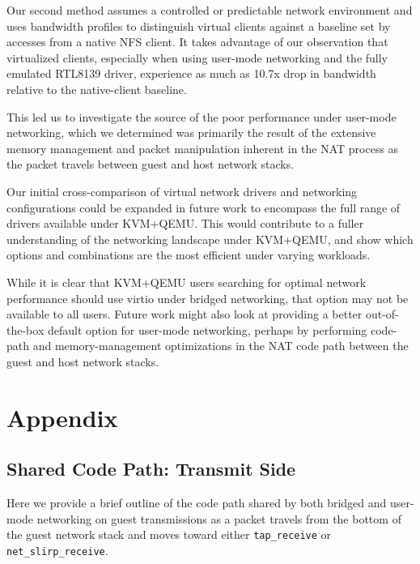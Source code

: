 \documentclass[letterpaper,twocolumn,11pt]{article}
\begin{document}
Our second method assumes a controlled or predictable network environment and uses bandwidth profiles to distinguish virtual clients against a baseline set by accesses from a native NFS client. It takes advantage of our observation that virtualized clients, especially when using user-mode networking and the fully emulated RTL8139 driver, experience as much as 10.7x drop in bandwidth relative to the native-client baseline. 

This led us to investigate the source of the poor performance under user-mode networking, which we determined was primarily the result of the extensive memory management and packet manipulation inherent in the NAT process as the packet travels between guest and host network stacks.

Our initial cross-comparison of virtual network drivers and networking configurations could be expanded in future work to encompass the full range of drivers available under KVM+QEMU. This would contribute to a fuller understanding of the networking landscape under KVM+QEMU, and show which options and combinations are the most efficient under varying workloads. 

While it is clear that KVM+QEMU users searching for optimal network performance should use virtio under bridged networking, that option may not be available to all users. Future work might also look at providing a better out-of-the-box default option for user-mode networking, perhaps by performing code-path and memory-management optimizations in the NAT code path between the guest and host network stacks.

{\footnotesize 
}

\section*{Appendix}
\label{sec:appendix}
\subsection*{Shared Code Path: Transmit Side}
Here we provide a brief outline of the code path shared by both bridged and user-mode networking on guest transmissions as a packet travels from the bottom of the guest network stack and moves toward either \texttt{tap\_receive} or \texttt{net\_slirp\_receive}. 
\end{document}
